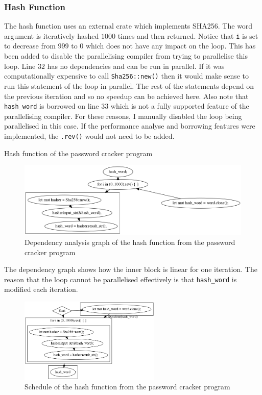 \subsubsection{Hash Function}
The hash function uses an external crate which implements SHA256. The word argument is iteratively hashed $1000$ times and then returned. Notice that \texttt{i} is set to decrease from $999$ to $0$ which does not have any impact on the loop. This has been added to disable the parallelising compiler from trying to parallelise this loop. Line $32$ has no dependencies and can be run in parallel. If it was computationally expensive to call \texttt{Sha256::new()} then it would make sense to run this statement of the loop in parallel. The rest of the statements depend on the previous iteration and so no speedup can be achieved here. Also note that \texttt{hash\_word} is borrowed on line $33$ which is not a  fully supported feature of the parallelising compiler. For these reasons, I manually disabled the loop being parallelised in this case. If the performance analyse and borrowing features were implemented, the \texttt{.rev()} would not need to be added.

\begin{code}
    \caption{Hash function of the password cracker program}
\end{code}

\begin{figure}[H]
    \centering
    \includegraphics[width=\textwidth]{img/password-cracker/hash-dependency-analysis.png}
    \caption{Dependency analysis graph of the hash function from the password cracker program}
\end{figure}

The dependency graph shows how the inner block is linear for one iteration. The reason that the loop cannot be parallelised effectively is that \texttt{hash\_word} is modified each iteration.

\begin{figure}[H]
    \centering
    \includegraphics[width=0.6\textwidth]{img/password-cracker/hash-schedule.png}
    \caption{Schedule of the hash function from the password cracker program}
\end{figure}

